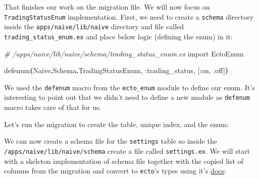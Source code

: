\documentclass[
  oneside]{book}
\newenvironment{Shaded}{\begin{snugshade}}{\end{snugshade}}
\newcommand{\CommentTok}[1]{\textcolor[rgb]{0.56,0.35,0.01}{\textit{#1}}}
\newcommand{\ConstantTok}[1]{\textcolor[rgb]{0.56,0.35,0.01}{#1}}
\newcommand{\ExtensionTok}[1]{#1}
\newcommand{\FunctionTok}[1]{\textcolor[rgb]{0.13,0.29,0.53}{\textbf{#1}}}
\newcommand{\ImportTok}[1]{#1}
\newcommand{\NormalTok}[1]{#1}
\newcommand{\OperatorTok}[1]{\textcolor[rgb]{0.81,0.36,0.00}{\textbf{#1}}}
\newcommand{\OtherTok}[1]{\textcolor[rgb]{0.56,0.35,0.01}{#1}}
\newcommand{\PreprocessorTok}[1]{\textcolor[rgb]{0.56,0.35,0.01}{\textit{#1}}}
\newcommand{\SpecialStringTok}[1]{\textcolor[rgb]{0.31,0.60,0.02}{#1}}
\newcommand{\StringTok}[1]{\textcolor[rgb]{0.31,0.60,0.02}{#1}}
\newcommand{\VariableTok}[1]{\textcolor[rgb]{0.00,0.00,0.00}{#1}}
\begin{document}
That finishes our work on the migration file. We will now focus on \texttt{TradingStatusEnum} implementation. First, we need to create a \texttt{schema} directory inside the \texttt{apps/naive/lib/naive} directory and file called \texttt{trading\_status\_enum.ex} and place below logic (defining the enum) in it:

\begin{Shaded}
\begin{Highlighting}[]
\CommentTok{\# /apps/naive/lib/naive/schema/trading\_status\_enum.ex}
\ImportTok{import} \ConstantTok{EctoEnum}

\NormalTok{defenum}\FunctionTok{(}\ConstantTok{Naive}\OperatorTok{.}\ConstantTok{Schema}\OperatorTok{.}\ConstantTok{TradingStatusEnum}\NormalTok{, }\VariableTok{:trading\_status}\NormalTok{, }\OtherTok{[}\VariableTok{:on}\NormalTok{, }\VariableTok{:off}\OtherTok{]}\FunctionTok{)}
\end{Highlighting}
\end{Shaded}

We used the \texttt{defenum} macro from the \texttt{ecto\_enum} module to define our enum. It's interesting to point out that we didn't need to define a new module as \texttt{defenum} macro takes care of that for us.

Let's run the migration to create the table, unique index, and the enum:

\begin{Shaded}
\end{Shaded}

We can now create a schema file for the \texttt{settings} table so inside the \texttt{/apps/naive/lib/naive/schema} create a file called \texttt{settings.ex}. We will start with a skeleton implementation of schema file together with the copied list of columns from the migration and convert to \texttt{ecto}'s types using it's \href{https://hexdocs.pm/ecto/Ecto.Schema.html\#module-primitive-types}{docs}:
\end{document}

